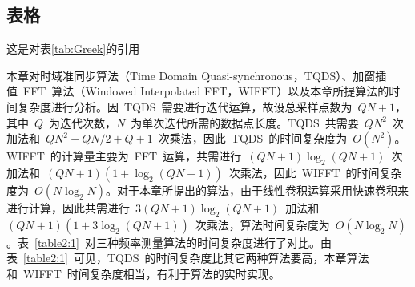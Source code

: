 \subsection{表格}
\begin{table}[H]
    \begin{center}
        \caption{希腊字母表\label{tab:Greek}}
    \end{center}
\end{table}
这是对表\ref{tab:Greek}的引用

\begin{table}[htbp]
    \caption{不同电力系统频率测量算法时间复杂度比较}\label{table2:1}
    \vspace{0.5em}\centering{}
    \vspace{\baselineskip}
\end{table}

本章对时域准同步算法（Time Domain Quasi-synchronous，TQDS）、加窗插值~FFT~算法（Windowed Interpolated FFT，WIFFT）以及本章所提算法的时间复杂度进行分析。因~TQDS~需要进行迭代运算，故设总采样点数为~$QN+1$，其中~$Q$~为迭代次数，$N$~为单次迭代所需的数据点长度。TQDS~共需要~$QN^2$~次加法和~$QN^2+QN/2+Q+1$~次乘法，因此~TQDS~的时间复杂度为~$O(N^2)$。WIFFT~的计算量主要为~FFT~运算，共需进行~$(QN+1)\log_2(QN+1)$~次加法和~$(QN+1)(1+\log_2(QN+1))$~次乘法，因此~WIFFT~的时间复杂度为~$O(N\log_2N)$。对于本章所提出的算法，由于线性卷积运算采用快速卷积来进行计算，因此共需进行~$3(QN+1)\log_2(QN+1)$~加法和~$(QN+1)(1+3\log_2(QN+1))$~次乘法，算法时间复杂度为~$O(N\log_2N)$。表~\ref{table2:1}~对三种频率测量算法的时间复杂度进行了对比。由表~\ref{table2:1}~可见，TQDS~的时间复杂度比其它两种算法要高，本章算法和~WIFFT~时间复杂度相当，有利于算法的实时实现。
